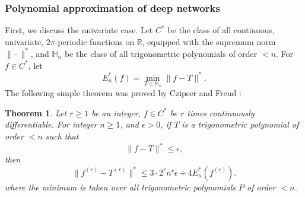 \documentclass[10pt]{article}
\providecommand{\scal}[2]{\left\langle{#1},{#2}\right\rangle}
\newtheorem{theorem}{Theorem}
\begin{document}


\subsubsection{Polynomial approximation of deep networks}
\label{simulapproxsect}
First, we discuss the univariate case. 
Let $C^*$ be the class of all continuous, univariate, $2\pi$-periodic functions on $\mathbb{R}$, equipped with the supremum norm $\|\cdot\|^*$, 
and $\mathbb{H}_n$ be the class of all trigonometric polynomials of order $<n$. 
For $f\in C^*$, let
$$
E_n^*(f)=\min_{T\in \mathbb{H}_n}\|f-T\|^*.
$$
The following simple theorem was proved by Czipser and Freud \cite[Theorem~1]{czipser1957approximation}:

\begin{theorem}\label{czipserfreudtheo}
Let $r\ge1$ be an integer, $f\in C^*$ be $r$ times continuously differentiable. 
For integer $n\ge 1$, and $\epsilon>0$, if $T$ is a trigonometric polynomial of order $<n$ such that
$$
\|f-T\|^* \le \epsilon,
$$
then
$$
\|f^{(r)}-T^{(r)}\|^* \le  3\cdot 2^r n^r\epsilon+4E_n^*(f^{(r)}).
$$
where the minimum is taken over all trigonometric polynomials $P$ of order $<n$. 
\end{theorem}
\end{document}
